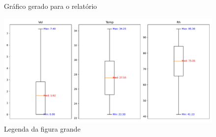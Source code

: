 \documentclass{article}
\begin{document}
\newpage

\begin{figure}[h!]
\centering
{}
\caption{Gráfico gerado para o relatório}
\end{figure}

\newpage

\begin{figure}[htb]
    \centering
    \includegraphics[width=\textwidth]{box_plots.pdf}
    \caption{Legenda da figura grande}
    \label{fig:figura_grande}
\end{figure}
\end{document}
